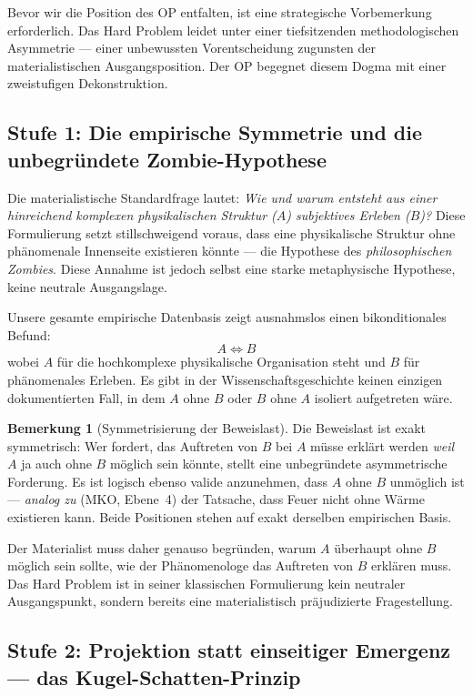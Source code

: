 \documentclass[11pt,a4paper]{article}
\theoremstyle{plain}
\theoremstyle{definition}
\newtheorem{remark}{Bemerkung}[section]
\begin{document}
Bevor wir die Position des OP entfalten, ist eine strategische Vorbemerkung erforderlich.
Das Hard Problem leidet unter einer tiefsitzenden methodologischen Asymmetrie --- einer
unbewussten Vorentscheidung zugunsten der materialistischen Ausgangsposition. Der OP
begegnet diesem Dogma mit einer zweistufigen Dekonstruktion.

\subsection{Stufe 1: Die empirische Symmetrie und die unbegr\"{u}ndete Zombie-Hypothese}

Die materialistische Standardfrage lautet: \emph{\glqq{}Wie und warum entsteht aus einer
hinreichend komplexen physikalischen Struktur ($A$) subjektives Erleben ($B$)?\grqq{}}
Diese Formulierung setzt stillschweigend voraus, dass eine physikalische Struktur ohne
ph\"{a}nomenale Innenseite existieren k\"{o}nnte --- die Hypothese des \emph{philosophischen
Zombies}. Diese Annahme ist jedoch selbst eine starke metaphysische Hypothese, keine
neutrale Ausgangslage.

Unsere gesamte empirische Datenbasis zeigt ausnahmslos einen bikonditionales Befund:
\[
  A \iff B
\]
wobei $A$ f\"{u}r die hochkomplexe physikalische Organisation steht und $B$ f\"{u}r
ph\"{a}nomenales Erleben. Es gibt in der Wissenschaftsgeschichte keinen einzigen
dokumentierten Fall, in dem $A$ ohne $B$ oder $B$ ohne $A$ isoliert aufgetreten w\"{a}re.

\begin{remark}[Symmetrisierung der Beweislast]
Die Beweislast ist exakt symmetrisch: Wer fordert, das Auftreten von $B$ bei $A$ m\"{u}sse
erkl\"{a}rt werden \emph{weil} $A$ ja auch ohne $B$ m\"{o}glich sein k\"{o}nnte, stellt
eine unbegr\"{u}ndete asymmetrische Forderung. Es ist logisch ebenso valide anzunehmen,
dass $A$ ohne $B$ unm\"{o}glich ist --- \emph{analog zu} (MKO, Ebene~4) der Tatsache,
dass Feuer nicht ohne W\"{a}rme existieren kann. Beide Positionen stehen auf exakt
derselben empirischen Basis.

Der Materialist muss daher genauso begr\"{u}nden, warum $A$ \"{u}berhaupt ohne $B$
m\"{o}glich sein sollte, wie der Ph\"{a}nomenologe das Auftreten von $B$ erkl\"{a}ren
muss. Das Hard Problem ist in seiner klassischen Formulierung kein neutraler Ausgangspunkt,
sondern bereits eine materialistisch pr\"{a}judizierte Fragestellung.
\end{remark}

\subsection{Stufe 2: Projektion statt einseitiger Emergenz --- das Kugel-Schatten-Prinzip}
\end{document}
